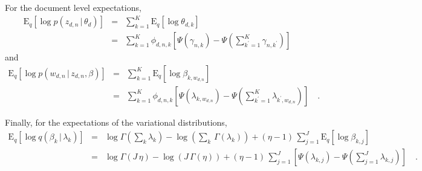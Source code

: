 \documentclass[11pt]{article}
\newcommand{\expect}[2]{\ensuremath{\mathrm{E}_{#1}\left [ {#2} \right ]}}
\begin{document}
For the document level expectations,
\begin{eqnarray}
\expect{q}{\log p(z_{d,n}\,|\,\theta_d)} &=&
\sum_{k=1}^K
\expect{q}{\log \theta_{d,k}} \nonumber \\
&=&
\sum_{k=1}^K
\phi_{d,n,k}
\left[\Psi (\gamma_{n,k}) - \Psi({\textstyle\sum}_{k^\prime=1}^K
\gamma_{n,k^\prime})
\right]
\end{eqnarray}
and
\begin{eqnarray}
\expect{q}{\log p(w_{d,n}\,|\,z_{d,n},\beta)} &=&
\sum_{k=1}^K
\expect{q}{\log \beta_{k,w_{d,n}}} \nonumber\\
&=&
\sum_{k=1}^K
\phi_{d,n,k}
\left[
\Psi (\lambda_{k,w_{d,n}})
- \Psi({\textstyle\sum}_{k^\prime=1}^K \lambda_{k^\prime,w_{d,n}})
\right] \quad.
\end{eqnarray}

Finally, for the expectations of the variational distributions,
\begin{eqnarray}
\expect{q}{\log q(\beta_k\,|\,\lambda_k)} &=&
\log \Gamma (\sum_k\lambda_k) - \log \left ( \sum_k\,\Gamma(\lambda_k) \right )
+ (\eta-1)\,\sum_{j=1}^J \expect{q}{\log\beta_{k,j}} \nonumber\\
&=&
\log \Gamma (J\,\eta) - \log \left ( J\,\Gamma(\eta) \right )
+ (\eta-1)\,\sum_{j=1}^J \left[ \Psi (\lambda_{k,j})
- \Psi({\textstyle\sum}_{j=1}^J \lambda_{k,j}) \right] \quad.
\end{eqnarray}
\end{document}
